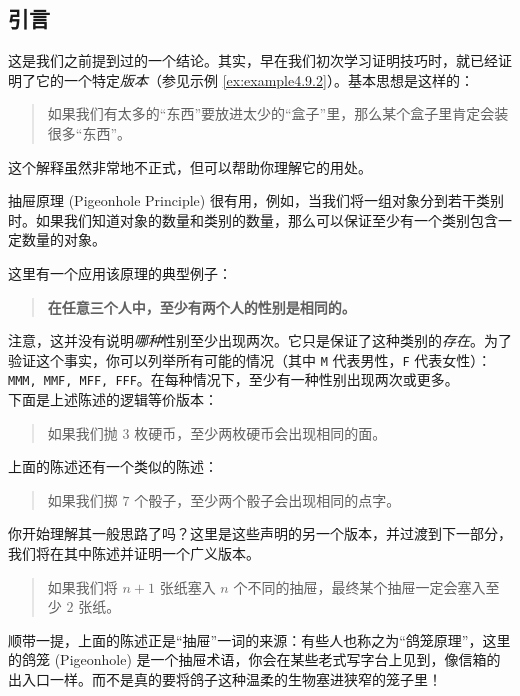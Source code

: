 
\subsection{引言}

这是我们之前提到过的一个结论。其实，早在我们初次学习证明技巧时，就已经证明了它的一个特定\emph{版本}（参见示例 \ref{ex:example4.9.2}）。基本思想是这样的：
\begin{quote}
    如果我们有太多的``东西''要放进太少的``盒子''里，那么某个盒子里肯定会装很多``东西''。
\end{quote}
这个解释虽然非常地不正式，但可以帮助你理解它的用处。

抽屉原理 (Pigeonhole Principle) 很有用，例如，当我们将一组对象分到若干类别时。如果我们知道对象的数量和类别的数量，那么可以保证至少有一个类别包含一定数量的对象。\\

\begin{example}
    这里有一个应用该原理的典型例子：
    \begin{quotation}
        \textbf{在任意三个人中，至少有两个人的性别是相同的。}
    \end{quotation}
    注意，这并没有说明\emph{哪种}性别至少出现两次。它只是保证了这种类别的\emph{存在}。为了验证这个事实，你可以列举所有可能的情况（其中 \verb|M| 代表男性，\verb|F| 代表女性）：\verb|MMM, MMF, MFF, FFF|。在每种情况下，至少有一种性别出现两次或更多。\\
    下面是上述陈述的逻辑等价版本：
    \begin{quotation}
        如果我们抛 $3$ 枚硬币，至少两枚硬币会出现相同的面。
    \end{quotation}
    上面的陈述还有一个类似的陈述：
    \begin{quotation}
        如果我们掷 $7$ 个骰子，至少两个骰子会出现相同的点字。
    \end{quotation}
    你开始理解其一般思路了吗？这里是这些声明的另一个版本，并过渡到下一部分，我们将在其中陈述并证明一个广义版本。
    \begin{quotation}
        如果我们将 $n + 1$ 张纸塞入 $n$ 个不同的抽屉，最终某个抽屉一定会塞入至少 $2$ 张纸。
    \end{quotation}
    顺带一提，上面的陈述正是``抽屉''一词的来源：有些人也称之为``鸽笼原理''，这里的鸽笼 (Pigeonhole) 是一个抽屉术语，你会在某些老式写字台上见到，像信箱的出入口一样。而不是真的要将鸽子这种温柔的生物塞进狭窄的笼子里！
\end{example}